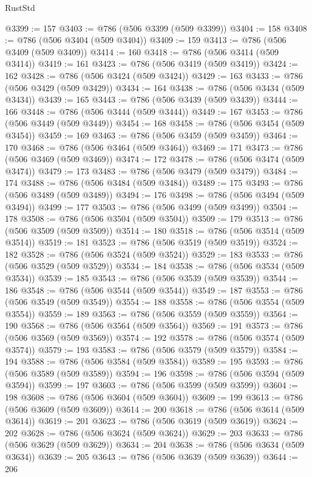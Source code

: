 \begin{lexlean}{RustStd}
\begin{coremodule}
{\begin{coremodule}
{{{{{{{{{{{{{{{{{{{{{{{{{{{{{{{{{{{{{{{{{{{{{{{{{{{{{{{@3399 := 157
@3403 := @786 (@506 @3399 (@509 @3399))
@3404 := 158
@3408 := @786 (@506 @3404 (@509 @3404))
@3409 := 159
@3413 := @786 (@506 @3409 (@509 @3409))
@3414 := 160
@3418 := @786 (@506 @3414 (@509 @3414))
@3419 := 161
@3423 := @786 (@506 @3419 (@509 @3419))
@3424 := 162
@3428 := @786 (@506 @3424 (@509 @3424))
@3429 := 163
@3433 := @786 (@506 @3429 (@509 @3429))
@3434 := 164
@3438 := @786 (@506 @3434 (@509 @3434))
@3439 := 165
@3443 := @786 (@506 @3439 (@509 @3439))
@3444 := 166
@3448 := @786 (@506 @3444 (@509 @3444))
@3449 := 167
@3453 := @786 (@506 @3449 (@509 @3449))
@3454 := 168
@3458 := @786 (@506 @3454 (@509 @3454))
@3459 := 169
@3463 := @786 (@506 @3459 (@509 @3459))
@3464 := 170
@3468 := @786 (@506 @3464 (@509 @3464))
@3469 := 171
@3473 := @786 (@506 @3469 (@509 @3469))
@3474 := 172
@3478 := @786 (@506 @3474 (@509 @3474))
@3479 := 173
@3483 := @786 (@506 @3479 (@509 @3479))
@3484 := 174
@3488 := @786 (@506 @3484 (@509 @3484))
@3489 := 175
@3493 := @786 (@506 @3489 (@509 @3489))
@3494 := 176
@3498 := @786 (@506 @3494 (@509 @3494))
@3499 := 177
@3503 := @786 (@506 @3499 (@509 @3499))
@3504 := 178
@3508 := @786 (@506 @3504 (@509 @3504))
@3509 := 179
@3513 := @786 (@506 @3509 (@509 @3509))
@3514 := 180
@3518 := @786 (@506 @3514 (@509 @3514))
@3519 := 181
@3523 := @786 (@506 @3519 (@509 @3519))
@3524 := 182
@3528 := @786 (@506 @3524 (@509 @3524))
@3529 := 183
@3533 := @786 (@506 @3529 (@509 @3529))
@3534 := 184
@3538 := @786 (@506 @3534 (@509 @3534))
@3539 := 185
@3543 := @786 (@506 @3539 (@509 @3539))
@3544 := 186
@3548 := @786 (@506 @3544 (@509 @3544))
@3549 := 187
@3553 := @786 (@506 @3549 (@509 @3549))
@3554 := 188
@3558 := @786 (@506 @3554 (@509 @3554))
@3559 := 189
@3563 := @786 (@506 @3559 (@509 @3559))
@3564 := 190
@3568 := @786 (@506 @3564 (@509 @3564))
@3569 := 191
@3573 := @786 (@506 @3569 (@509 @3569))
@3574 := 192
@3578 := @786 (@506 @3574 (@509 @3574))
@3579 := 193
@3583 := @786 (@506 @3579 (@509 @3579))
@3584 := 194
@3588 := @786 (@506 @3584 (@509 @3584))
@3589 := 195
@3593 := @786 (@506 @3589 (@509 @3589))
@3594 := 196
@3598 := @786 (@506 @3594 (@509 @3594))
@3599 := 197
@3603 := @786 (@506 @3599 (@509 @3599))
@3604 := 198
@3608 := @786 (@506 @3604 (@509 @3604))
@3609 := 199
@3613 := @786 (@506 @3609 (@509 @3609))
@3614 := 200
@3618 := @786 (@506 @3614 (@509 @3614))
@3619 := 201
@3623 := @786 (@506 @3619 (@509 @3619))
@3624 := 202
@3628 := @786 (@506 @3624 (@509 @3624))
@3629 := 203
@3633 := @786 (@506 @3629 (@509 @3629))
@3634 := 204
@3638 := @786 (@506 @3634 (@509 @3634))
@3639 := 205
@3643 := @786 (@506 @3639 (@509 @3639))
@3644 := 206
}}}}}}}}}}}}}}}}}}}}}}}}}}}}}}}}}}}}}}}}}}}}}}}}}}}}}}}
\end{coremodule}}
\end{coremodule}
\end{lexlean}
